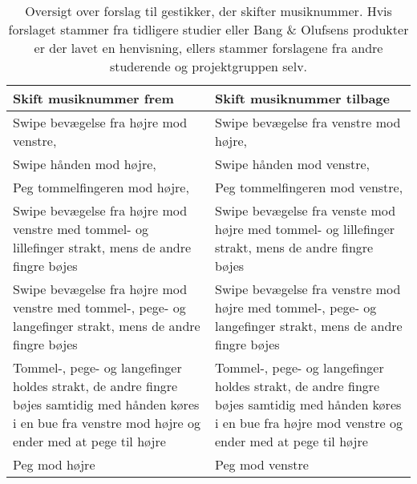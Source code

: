 \begin{table}[H]
	\centering
	\begin{tabular}{| p{6cm} | p{6cm} |}
		\hline
		\textbf{Skift musiknummer frem} & \textbf{Skift musiknummer tilbage} \\ \hline
		Swipe bevægelse fra højre mod venstre, \parencite[s. 48]{ WEB:Beosound2, WEB:BeosoundMoment, PDF:UserDefinedGesturesTV} & Swipe bevægelse fra venstre mod højre, \parencite[s. 48]{PDF:UserDefinedGesturesTV} \\ \hline
		Swipe hånden mod højre, \parencite[s. 166]{PDF:ComparingInputModalities}  & Swipe hånden mod venstre, \parencite[s. 166]{PDF:ComparingInputModalities}  \\ \hline
		Peg tommelfingeren mod højre, \parencite[s. 166]{PDF:ComparingInputModalities} & Peg tommelfingeren mod venstre, \parencite[s. 166]{PDF:ComparingInputModalities} \\ \hline
		Swipe bevægelse fra højre mod venstre med tommel- og lillefinger strakt, mens de andre fingre bøjes & Swipe bevægelse fra venste mod højre med tommel- og lillefinger strakt, mens de andre fingre bøjes \\ \hline
		Swipe bevægelse fra højre mod venstre med tommel-, pege- og langefinger strakt, mens de andre fingre bøjes & Swipe bevægelse fra venstre mod højre med tommel-, pege- og langefinger strakt, mens de andre fingre bøjes \\ \hline
		Tommel-, pege- og langefinger holdes strakt, de andre fingre bøjes samtidig med hånden køres i en bue fra venstre mod højre og ender med at pege til højre & Tommel-, pege- og langefinger holdes strakt, de andre fingre bøjes samtidig med hånden køres i en bue fra højre mod venstre og ender med at pege til højre\\ \hline
		Peg mod højre & Peg mod venstre\\ \hline
		
	\end{tabular}
	\caption{Oversigt over forslag til gestikker, der skifter musiknummer. Hvis forslaget stammer fra tidligere studier eller Bang $\&$ Olufsens produkter er der lavet en henvisning, ellers stammer forslagene fra andre studerende og projektgruppen selv.}
	\label{tab:IndsamledeGestikkerSkift}
\end{table}
\noindent


